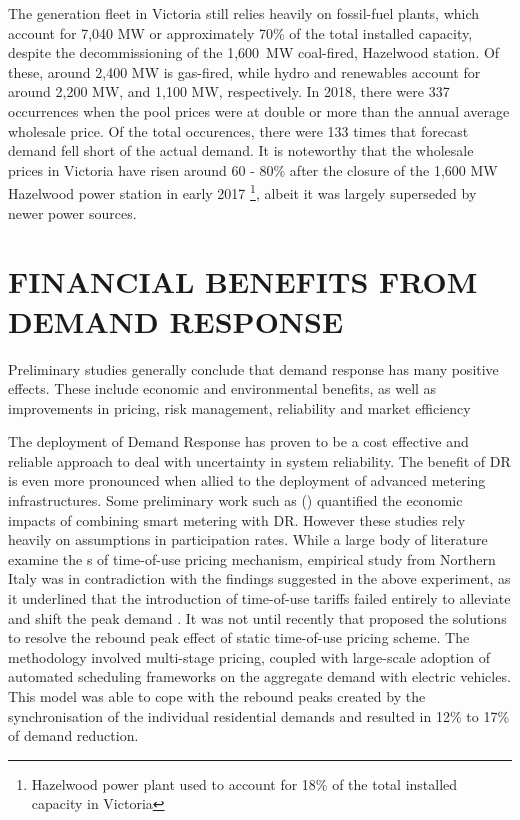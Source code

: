 \documentclass{pasa}%
\begin{document}
The generation fleet in Victoria still relies heavily on fossil-fuel plants, which account for 7,040 MW or approximately 70\% of the total installed capacity, despite the decommissioning of the 1,600~MW coal-fired, Hazelwood station. Of these, around 2,400 MW is gas-fired, while hydro and renewables account for around 2,200 MW, and 1,100 MW, respectively. In 2018, there were 337 occurrences when the pool prices were at double or more than the annual average wholesale price. Of the total occurences, there were 133 times that forecast demand fell short of the actual demand. It is noteworthy that the wholesale prices in Victoria have risen around 60 - 80\% after the closure of the 1,600 MW Hazelwood power station in early 2017 \footnote{Hazelwood power plant used to account for 18\% of the total installed capacity in Victoria}, albeit it was largely superseded by newer power sources.

\section{FINANCIAL BENEFITS FROM DEMAND RESPONSE}
\label{sec:financial}
Preliminary studies generally conclude that demand response has  many positive effects. These include economic and environmental benefits, as well as improvements in pricing, risk management, reliability and market efficiency

The deployment of Demand Response has proven to be a cost effective and reliable approach to deal with uncertainty in system reliability. The benefit of DR is even more pronounced when allied to the deployment of advanced metering infrastructures. Some preliminary work such as (\cite{faruqui2010,ofgem2010}) quantified the economic impacts of combining smart metering with DR. However these studies rely heavily on assumptions in participation rates. While a large body of literature \cite{faruqui2012,lawson1992,filippini2011,henley1994} examine the s of time-of-use pricing mechanism, empirical study from Northern Italy was in contradiction with the findings suggested in the above experiment, as it underlined that the introduction of time-of-use tariffs failed entirely to alleviate and shift the peak demand \cite{torriti2012}. It was not until recently that \cite{muratori2016} proposed the solutions to resolve the rebound peak effect of static time-of-use pricing scheme. The methodology involved multi-stage pricing, coupled with large-scale adoption of automated scheduling frameworks on the aggregate demand with electric vehicles. This model was able to cope with the rebound peaks created by the synchronisation of the individual residential demands and resulted in 12\% to 17\% of demand reduction.
\end{document}
